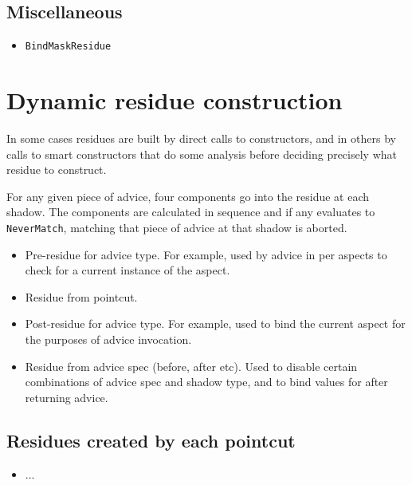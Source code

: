 \documentclass{article}
\begin{document}
\subsection{Miscellaneous}
\begin{itemize}
\item \verb|BindMaskResidue|
\end{itemize}


\section{Dynamic residue construction}
\label{constructing}

In some cases residues are built by direct calls to constructors,
and in others by calls to smart constructors that do some analysis before
deciding precisely what residue to construct.

For any given piece of advice, four components go into the residue at each 
shadow. The components are calculated in sequence and if any evaluates to
\verb|NeverMatch|, matching that piece of advice at that shadow is aborted.

\begin{itemize}
\item Pre-residue for advice type. For example, used by advice in per aspects
to check for a current instance of the aspect.
\item Residue from pointcut.
\item Post-residue for advice type. For example, used to bind the current
aspect for the purposes of advice invocation.
\item Residue from advice spec (before, after etc). Used to disable certain
combinations of advice spec and shadow type, and to bind values for after
returning advice.
\end{itemize}

\subsection{Residues created by each pointcut}

\begin{itemize}
\item ...
\end{itemize}
\end{document}

